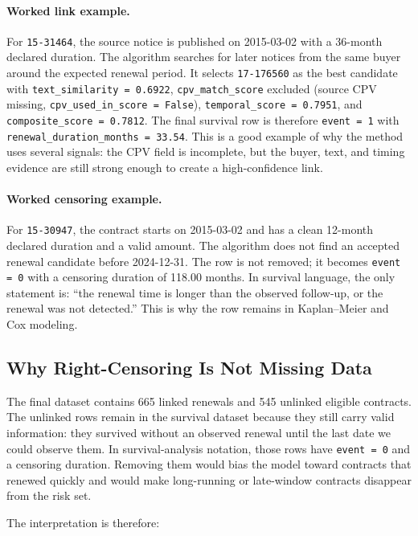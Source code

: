 \documentclass[12pt, a4paper]{article}
\begin{document}
\paragraph{Worked link example.}
For \texttt{15-31464}, the source notice is published on 2015-03-02 with a
36-month declared duration. The algorithm searches for later notices from the
same buyer around the expected renewal period. It selects \texttt{17-176560} as
the best candidate with \texttt{text\_similarity = 0.6922},
\texttt{cpv\_match\_score} excluded (source CPV missing, \texttt{cpv\_used\_in\_score = False}),
\texttt{temporal\_score = 0.7951}, and \texttt{composite\_score = 0.7812}. The
final survival row is therefore \texttt{event = 1} with
\texttt{renewal\_duration\_months = 33.54}. This is a good example of why the
method uses several signals: the CPV field is incomplete, but the buyer, text,
and timing evidence are still strong enough to create a high-confidence link.

\paragraph{Worked censoring example.}
For \texttt{15-30947}, the contract starts on 2015-03-02 and has a clean
12-month declared duration and a valid amount. The algorithm does not find an
accepted renewal candidate before 2024-12-31. The row is not removed; it becomes
\texttt{event = 0} with a censoring duration of 118.00 months. In survival
language, the only statement is: ``the renewal time is longer than the observed
follow-up, or the renewal was not detected.'' This is why the row remains in
Kaplan--Meier and Cox modeling.

\subsection{Why Right-Censoring Is Not Missing Data}

The final dataset contains 665 linked renewals and 545 unlinked eligible
contracts. The unlinked rows remain in the survival dataset because they still
carry valid information: they survived without an observed renewal until the
last date we could observe them. In survival-analysis notation, those rows have
\texttt{event = 0} and a censoring duration. Removing them would bias the model
toward contracts that renewed quickly and would make long-running or late-window
contracts disappear from the risk set.

The interpretation is therefore:
\end{document}
